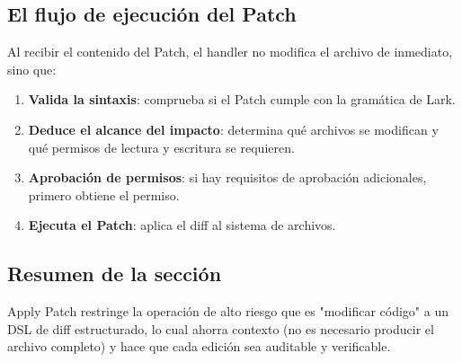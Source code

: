 \subsection{El flujo de ejecución del Patch}

Al recibir el contenido del Patch, el handler no modifica el archivo de inmediato, sino que:
\begin{enumerate}
    \item \textbf{Valida la sintaxis}: comprueba si el Patch cumple con la gramática de Lark.
    \item \textbf{Deduce el alcance del impacto}: determina qué archivos se modifican y qué permisos de lectura y escritura se requieren.
    \item \textbf{Aprobación de permisos}: si hay requisitos de aprobación adicionales, primero obtiene el permiso.
    \item \textbf{Ejecuta el Patch}: aplica el diff al sistema de archivos.
\end{enumerate}

\subsection{Resumen de la sección}

Apply Patch restringe la operación de alto riesgo que es "modificar código" a un DSL de diff estructurado, lo cual ahorra contexto (no es necesario producir el archivo completo) y hace que cada edición sea auditable y verificable.

